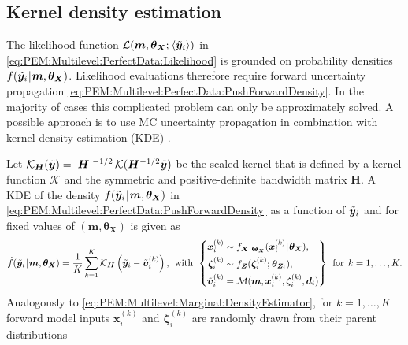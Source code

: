 \subsection{Kernel density estimation} \label{sec:PEM:PerfectData:KDE}
The likelihood function \(\mathcal{L} (\bm{m},\bm{\theta}_{\bm{X}} ;{\:\!} \langle{\tilde{\bm{y}}_i}\rangle)\) in \cref{eq:PEM:Multilevel:PerfectData:Likelihood}
is grounded on probability densities \(f (\tilde{\bm{y}}_i {\:\!}|{\:\!} \bm{m},\bm{\theta}_{\bm{X}})\).
Likelihood evaluations therefore require forward uncertainty propagation \cref{eq:PEM:Multilevel:PerfectData:PushForwardDensity}.
In the majority of cases this complicated problem can only be approximately solved.
A possible approach is to use MC uncertainty propagation in combination with kernel density estimation (KDE) \cite{PCE:Sudret2008:a:Proc}.
\par %
Let \(\mathcal{K}_{\bm{H}}(\tilde{\bm{y}}) = \lvert \bm{H} \rvert^{-1/2} \, \mathcal{K} (\bm{H}^{-1/2} \tilde{\bm{y}})\) be the scaled kernel that is defined by a kernel function \(\mathcal{K}\)
and the symmetric and positive-definite bandwidth matrix \(\bm{H}\).
A KDE of the density \(f (\tilde{\bm{y}}_i {\:\!}|{\:\!} \bm{m},\bm{\theta}_{\bm{X}})\) in \cref{eq:PEM:Multilevel:PerfectData:PushForwardDensity} 
as a function of \(\tilde{\bm{y}}_i\) and for fixed values of \((\bm{m},\bm{\theta}_{\bm{X}})\) is given as
\begin{equation} \label{eq:PEM:Multilevel:PerfectData:DensityEstimator}
  \hat{f} (\tilde{\bm{y}}_i {\:\!}|{\:\!} \bm{m},\bm{\theta}_{\bm{X}})
  = \frac{1}{K} \sum\limits_{k=1}^{K} \mathcal{K}_{\bm{H}} \left( \tilde{\bm{y}}_i-\tilde{\bm{\upsilon}}_i^{(k)} \right),
  \;\, \text{with} \;\, \left\{
  \begin{aligned}
    \bm{x}_i^{(k)} &\sim f_{\bm{X} {\:\!}|{\:\!} \bm{\Theta}_{\bm{X}}}(\bm{x}_i^{(k)} {\:\!}|{\:\!} \bm{\theta}_{\bm{X}}),\\
    \bm{\zeta}_i^{(k)} &\sim f_{\bm{Z}}(\bm{\zeta}_i^{(k)} ;{\:\!} \bm{\theta}_{\bm{Z}_i}),\\
    \tilde{\bm{\upsilon}}_i^{(k)} &= \mathcal{M}(\bm{m},\bm{x}_i^{(k)},\bm{\zeta}_i^{(k)},\bm{d}_i)
  \end{aligned}
  \right\} \;\, \text{for} \;\, k=1,\ldots,K.
\end{equation}
Analogously to \cref{eq:PEM:Multilevel:Marginal:DensityEstimator}, for \(k=1,\ldots,K\) forward model inputs \(\bm{x}_i^{(k)}\) and \(\bm{\zeta}_i^{(k)}\) are randomly drawn from their parent distributions
